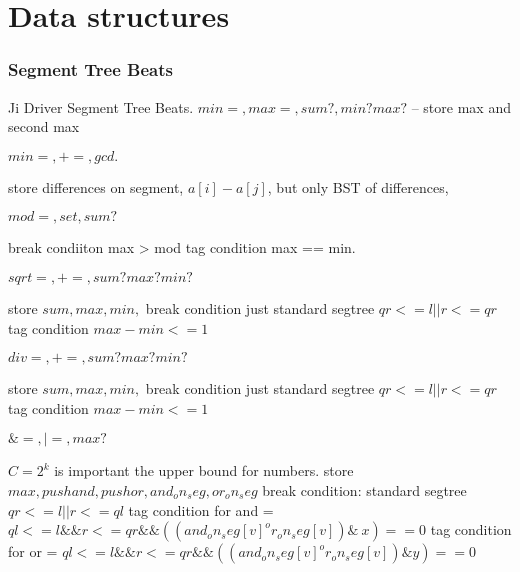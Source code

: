 \chapter{Data structures}


\subsection{Segment Tree Beats}
Ji Driver Segment Tree Beats.
$min=, max=, sum?, min? max?$ -- store max and second max

$min=, +=, gcd.$

store differences on segment, $a[i] - a[j]$, but only BST of differences, 

$mod=, set, sum?$

break condiiton max > mod
tag condition max == min.

$sqrt=, +=, sum? max? min?$

store $sum, max, min,$
break condition just standard segtree $qr <= l || r <= qr$
tag condition $max - min <= 1$

$div=, +=, sum? max? min?$

store $sum, max, min,$
break condition just standard segtree $qr <= l || r <= qr$
tag condition $max - min <= 1$


$\&=, |=, max?$

$C = 2^k$ is important the upper bound for numbers.
store $max, pushand, pushor, and_on_seg, or_on_seg$
break condition: standard segtree $qr <= l || r <= ql$
tag condition for and = $ql <= l \&\& r <= qr \&\& ((and_on_seg[v] ^ or_on_seg[v]) \& ~x) == 0$
tag condition for or = $ql <= l \&\& r <= qr \&\& ((and_on_seg[v] ^ or_on_seg[v]) \& y) == 0$













